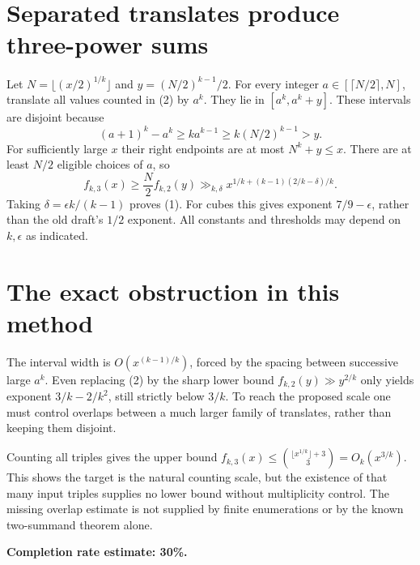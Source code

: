 \documentclass[11pt]{article}
\begin{document}
\section*{Separated translates produce three-power sums}
Let $N=\lfloor(x/2)^{1/k}\rfloor$ and $y=(N/2)^{k-1}/2$. For every integer $a\in[\lceil N/2\rceil,N]$, translate all values counted in (2) by $a^k$. They lie in $[a^k,a^k+y]$. These intervals are disjoint because
\[
 (a+1)^k-a^k\ge k a^{k-1}\ge k(N/2)^{k-1}>y.
\]
For sufficiently large $x$ their right endpoints are at most $N^k+y\le x$. There are at least $N/2$ eligible choices of $a$, so
\[
 f_{k,3}(x)\ge\frac N2 f_{k,2}(y)
 \gg_{k,\delta}x^{1/k+(k-1)(2/k-\delta)/k}.
\]
Taking $\delta=\epsilon k/(k-1)$ proves (1). For cubes this gives exponent $7/9-\epsilon$, rather than the old draft's $1/2$ exponent. All constants and thresholds may depend on $k,\epsilon$ as indicated.

\section*{The exact obstruction in this method}
The interval width is $O(x^{(k-1)/k})$, forced by the spacing between successive large $a^k$. Even replacing (2) by the sharp lower bound $f_{k,2}(y)\gg y^{2/k}$ only yields exponent $3/k-2/k^2$, still strictly below $3/k$. To reach the proposed scale one must control overlaps between a much larger family of translates, rather than keeping them disjoint.

Counting all triples gives the upper bound $f_{k,3}(x)\le\binom{\lfloor x^{1/k}\rfloor+3}{3}=O_k(x^{3/k})$. This shows the target is the natural counting scale, but the existence of that many input triples supplies no lower bound without multiplicity control. The missing overlap estimate is not supplied by finite enumerations or by the known two-summand theorem alone.

\textbf{Completion rate estimate: 30\%.}
\end{document}
